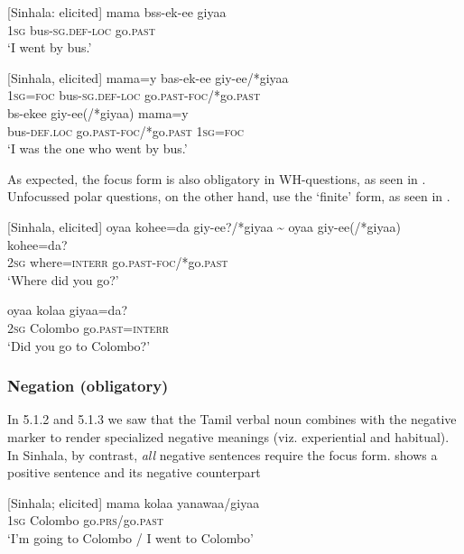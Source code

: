 \ea\label{smith:ex:23}
{}[Sinhala: elicited]
\gll mama bss-ek-ee giyaa\\
1\textsc{sg} bus-\textsc{sg}.\textsc{def}-\textsc{loc} go.\textsc{past}\\
`I went by bus.'
\z


\ea\label{smith:ex:24} 
{}[Sinhala, elicited]
\ea
\gll mama=y bas-ek-ee giy-ee/*giyaa \\
1\textsc{sg}=\textsc{foc} bus-\textsc{sg}.\textsc{def}-\textsc{loc} go.\textsc{past}-\textsc{foc}/*go.\textsc{past}\\
\ex
\gll   b{\textschwa}s-ekee giy-ee(/*giyaa) mama=y \\
     bus-\textsc{def}.\textsc{loc} go.\textsc{past}-\textsc{foc}/*go.\textsc{past} 1\textsc{sg}=\textsc{foc}   \\
`I was the one who went by bus.'
\z
\z


As expected, the focus form is also obligatory in WH-questions, as seen in . Unfocussed polar questions, on the other hand, use the `finite' form, as seen in .

\ea\label{smith:ex:25}
{}[Sinhala, elicited]
\gll oyaa kohee=da giy-ee?/*giyaa \~{} oyaa giy-ee(/*giyaa) kohee=da?\\
2\textsc{sg} where=\textsc{interr} go.\textsc{past}-\textsc{foc}/*go.\textsc{past}\\
`Where did you go?'
\z

\ea\label{smith:ex:26}
\gll oyaa kola{\umb}a  giyaa=da?\\
2\textsc{sg} Colombo go.\textsc{past}=\textsc{interr}\\
`Did you go to Colombo?'
\z

\subsubsection{Negation (obligatory)}%
In 5.1.2 and 5.1.3 we saw that the Tamil verbal noun combines with the negative marker to render specialized negative meanings (viz. experiential and habitual). In Sinhala, by contrast, \textit{all} negative sentences require the focus form.  shows a positive sentence and  its negative counterpart

\ea\label{smith:ex:27}
{}[Sinhala; elicited]
\gll mama kola{\umb}a yanawaa/giyaa\\
1\textsc{sg} Colombo go.\textsc{prs}/go.\textsc{past}\\
`I'm going to Colombo / I went to Colombo'
\z

